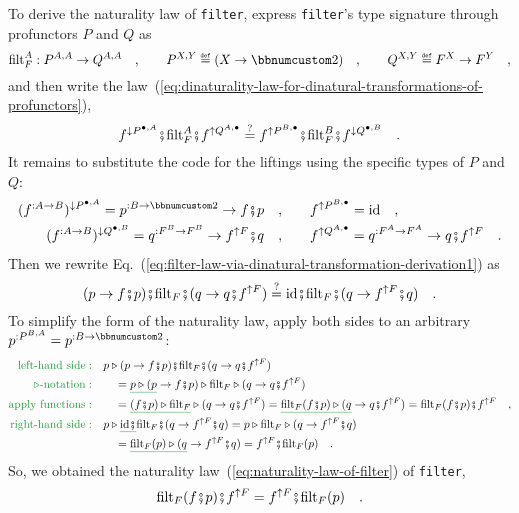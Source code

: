 To derive the naturality law of \lstinline!filter!, express \lstinline!filter!\textsf{'}s
type signature through profunctors $P$ and $Q$ as
\[
\text{filt}_{F}^{A}:P^{A,A}\rightarrow Q^{A,A}\quad,\quad\quad P^{X,Y}\triangleq(X\rightarrow\bbnum 2)\quad,\quad\quad Q^{X,Y}\triangleq F^{X}\rightarrow F^{Y}\quad,
\]
and then write the law~(\ref{eq:dinaturality-law-for-dinatural-transformations-of-profunctors}),
\begin{equation}
f^{\downarrow P^{\bullet,A}}\bef\text{filt}_{F}^{A}\bef f^{\uparrow Q^{A,\bullet}}\overset{?}{=}f^{\uparrow P^{B,\bullet}}\bef\text{filt}_{F}^{B}\bef f^{\downarrow Q^{\bullet,B}}\quad.\label{eq:filter-law-via-dinatural-transformation-derivation1}
\end{equation}
It remains to substitute the code for the liftings using the specific
types of $P$ and $Q$:
\begin{align*}
(f^{:A\rightarrow B})^{\downarrow P^{\bullet,A}}=p^{:B\rightarrow\bbnum 2}\rightarrow f\bef p\quad, & \quad\quad f^{\uparrow P^{B,\bullet}}=\text{id}\quad,\\
(f^{:A\rightarrow B})^{\downarrow Q^{\bullet,B}}=q^{:F^{B}\rightarrow F^{B}}\rightarrow f^{\uparrow F}\bef q\quad, & \quad\quad f^{\uparrow Q^{A,\bullet}}=q^{:F^{A}\rightarrow F^{A}}\rightarrow q\bef f^{\uparrow F}\quad.
\end{align*}
Then we rewrite Eq.~(\ref{eq:filter-law-via-dinatural-transformation-derivation1})
as
\[
(p\rightarrow f\bef p)\bef\text{filt}_{F}\bef(q\rightarrow q\bef f^{\uparrow F})\overset{?}{=}\text{id}\bef\text{filt}_{F}\bef(q\rightarrow f^{\uparrow F}\bef q)\quad.
\]
To simplify the form of the naturality law, apply both sides to an
arbitrary $p^{:P^{B,A}}=p^{:B\rightarrow\bbnum 2}$:
\begin{align*}
{\color{greenunder}\text{left-hand side}:}\quad & p\triangleright(p\rightarrow f\bef p)\bef\text{filt}_{F}\bef(q\rightarrow q\bef f^{\uparrow F})\\
{\color{greenunder}\triangleright\text{-notation}:}\quad & \quad=\gunderline{p\triangleright(p}\rightarrow f\bef p)\triangleright\text{filt}_{F}\triangleright(q\rightarrow q\bef f^{\uparrow F})\\
{\color{greenunder}\text{apply functions}:}\quad & \quad=\gunderline{(f\bef p)\triangleright\text{filt}_{F}}\triangleright(q\rightarrow q\bef f^{\uparrow F})=\gunderline{\text{filt}_{F}(f\bef p)\triangleright(q}\rightarrow q\bef f^{\uparrow F})=\text{filt}_{F}(f\bef p)\bef f^{\uparrow F}\quad,\\
{\color{greenunder}\text{right-hand side}:}\quad & p\triangleright\gunderline{\text{id}\bef}\text{filt}_{F}\bef(q\rightarrow f^{\uparrow F}\bef q)=p\triangleright\text{filt}_{F}\triangleright(q\rightarrow f^{\uparrow F}\bef q)\\
 & \quad=\gunderline{\text{filt}_{F}(p)\triangleright(q}\rightarrow f^{\uparrow F}\bef q)=f^{\uparrow F}\bef\text{filt}_{F}(p)\quad.
\end{align*}
So, we obtained the naturality law~(\ref{eq:naturality-law-of-filter})
of \lstinline!filter!,
\[
\text{filt}_{F}(f\bef p)\bef f^{\uparrow F}=f^{\uparrow F}\bef\text{filt}_{F}(p)\quad.
\]


